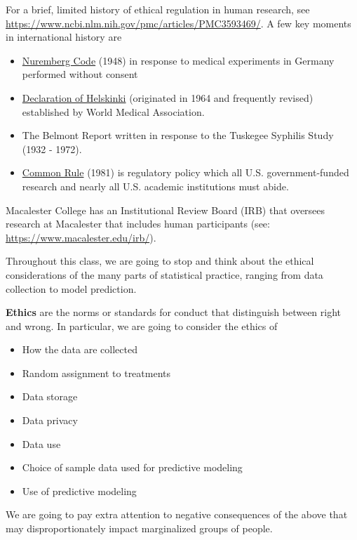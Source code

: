 \documentclass[
]{book}
\providecommand{\tightlist}{%
  \setlength{\itemsep}{0pt}\setlength{\parskip}{0pt}}
\begin{document}
For a brief, limited history of ethical regulation in human research, see \url{https://www.ncbi.nlm.nih.gov/pmc/articles/PMC3593469/}. A few key moments in international history are

\begin{itemize}
\tightlist
\item
  \href{https://www.nejm.org/doi/full/10.1056/NEJM199711133372006}{Nuremberg Code} (1948) in response to medical experiments in Germany performed without consent
\item
  \href{https://www.wma.net/what-we-do/medical-ethics/}{Declaration of Helskinki} (originated in 1964 and frequently revised) established by World Medical Association.
\item
  The Belmont Report written in response to the Tuskegee Syphilis Study (1932 - 1972).
\item
  \href{https://www.hhs.gov/ohrp/regulations-and-policy/regulations/common-rule/index.html}{Common Rule} (1981) is regulatory policy which all U.S. government-funded research and nearly all U.S. academic institutions must abide.
\end{itemize}

Macalester College has an Institutional Review Board (IRB) that oversees research at Macalester that includes human participants (see: \url{https://www.macalester.edu/irb/}).

Throughout this class, we are going to stop and think about the ethical considerations of the many parts of statistical practice, ranging from data collection to model prediction.

\textbf{Ethics} are the norms or standards for conduct that distinguish between right and wrong. In particular, we are going to consider the ethics of

\begin{itemize}
\tightlist
\item
  How the data are collected
\item
  Random assignment to treatments
\item
  Data storage
\item
  Data privacy
\item
  Data use
\item
  Choice of sample data used for predictive modeling
\item
  Use of predictive modeling
\end{itemize}

We are going to pay extra attention to negative consequences of the above that may disproportionately impact marginalized groups of people.
\end{document}
